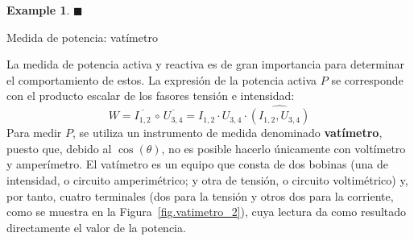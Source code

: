 \documentclass[11pt]{book} %
\makeatletter
\numberwithin{dummy}{section}
\theoremstyle{ocrenumbox}
\theoremstyle{blacknumex}
\newtheorem{exampleT}{Example}[chapter]
\theoremstyle{blacknumbox}
\theoremstyle{ocrenum}
\newenvironment{example}{\begin{exampleT}}{\hfill{\tiny\ensuremath{\blacksquare}}\end{exampleT}}
\renewcommand{\subsection}{\@startsection {subsection}{2}{\z@}
{-3ex \@plus -0.1ex \@minus -.4ex}
{0.5ex \@plus.2ex }
{\normalfont\sffamily\bfseries}}
\newlength\esp
\makeatother
\begin{document}
\begin{example}
	\end{example}
	
	\subsection{Medida de potencia: vatímetro}\label{sec.medida_potencia}
	
	La medida de potencia activa y reactiva es de gran importancia para determinar el comportamiento de estos. La expresión de la potencia activa $P$ se corresponde con el producto escalar de los fasores tensión e intensidad:
	\begin{equation*}
	    W=\overline{I_{1,2}}\,\circ\,\overline{U_{3,4}}=I_{1,2}\cdot U_{3,4}\cdot \widehat{(I_{1,2}, U_{3,4})}
	\end{equation*}
	Para medir $P$, se utiliza un instrumento de medida denominado \textbf{vatímetro}, puesto que, debido al $\cos(\theta)$, no es posible hacerlo únicamente con voltímetro y amperímetro. El vatímetro es un equipo que consta de dos bobinas (una de intensidad, o circuito amperimétrico; y otra de tensión, o circuito voltimétrico) y, por tanto, cuatro terminales (dos para la tensión y otros dos para la corriente, como se muestra en la Figura~\ref{fig.vatimetro_2}), cuya lectura da como resultado directamente el valor de la potencia. %
	
\end{document}
